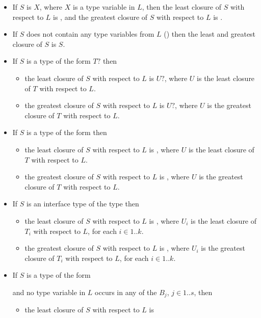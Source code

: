 \documentclass[makeidx]{article}
\begin{document}
\begin{itemize}
\item
  If $S$ is $X$, where $X$ is a type variable in $L$, then
  the least closure of $S$ with respect to $L$ is ,
  and the greatest closure of $S$ with respect to $L$ is .
\item
  If $S$ does not contain any type variables from $L$
  ()
  then the least and greatest closure of $S$ is $S$.
\item
  If $S$ is a type of the form $T?$ then
  \begin{itemize}
  \item
    the least closure of $S$ with respect to $L$ is $U?$,
    where $U$ is the least closure of $T$ with respect to $L$.
  \item
    the greatest closure of $S$ with respect to $L$ is $U?$,
    where $U$ is the greatest closure of $T$ with respect to $L$.
  \end{itemize}
\item
  If $S$ is a type of the form  then
  \begin{itemize}
  \item
    the least closure of $S$ with respect to $L$ is ,
    where $U$ is the least closure of $T$ with respect to $L$.
  \item
    the greatest closure of $S$ with respect to $L$ is ,
    where $U$ is the greatest closure of $T$ with respect to $L$.
  \end{itemize}
\item
  If $S$ is an interface type of the type  then
  \begin{itemize}
  \item
    the least closure of $S$ with respect to $L$ is ,
    where $U_i$ is the least closure of $T_i$ with respect to $L$,
    for each $i \in 1 .. k$.
  \item
    the greatest closure of $S$ with respect to $L$
    is ,
    where $U_i$ is the greatest closure of $T_i$ with respect to $L$,
    for each $i \in 1 .. k$.
  \end{itemize}
\item
  If $S$ is a type of the form

  \noindent

  \noindent
  and no type variable in $L$ occurs in any of the $B_j$, $j \in 1 .. s$,
  then
  \begin{itemize}
  \item
    the least closure of $S$ with respect to $L$ is


\end{itemize}
\end{itemize}
\end{document}
